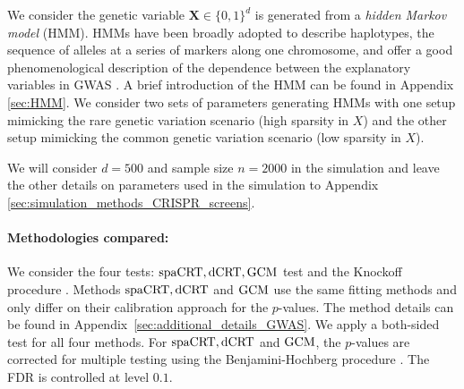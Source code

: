 \documentclass[12pt]{article}
\theoremstyle{definition}
\newcommand{\prx}{\bm X}								%
\newcommand{\dCRT}{\textnormal{dCRT}} 					%
\newcommand{\GCM}{\textnormal{GCM}}						%
\newcommand{\spacrt}{\textnormal{spaCRT}}               %
\begin{document}
  We consider the genetic variable $\prx \in\{0,1\}^{d}$ is generated from a \textit{hidden Markov model} (HMM). HMMs have been broadly adopted to describe haplotypes, the sequence of alleles at a series of markers along one chromosome, and offer a good phenomenological description of the dependence between the explanatory variables in GWAS \citep{scheet2006fast,marchini2007new,browning2007rapid}. A brief introduction of the HMM can be found in Appendix \ref{sec:HMM}. We consider two sets of parameters generating HMMs with one setup mimicking the rare genetic variation scenario (high sparsity in $X$) and the other setup mimicking the common genetic variation scenario (low sparsity in $X$). 
  
  We will consider $d=500$ and sample size $n=2000$ in the simulation and leave the other details on parameters used in the simulation to Appendix \ref{sec:simulation_methods_CRISPR_screens}. 
  
  \paragraph{Methodologies compared:}
  
  We consider the four tests: $\spacrt,\dCRT,\GCM$ test and the Knockoff procedure \citep{barber2015controlling}. Methods $\spacrt,\dCRT$ and $\GCM$ use the same fitting methods and only differ on their calibration approach for the $p$-values. The method details can be found in Appendix~\ref{sec:additional_details_GWAS}. We apply a both-sided test for all four methods. For $\spacrt,\dCRT$ and $\GCM$, the $p$-values are corrected for multiple testing using the Benjamini-Hochberg procedure \citep{benjamini1995controlling}. The FDR is controlled at level $0.1$.
  
\end{document}
